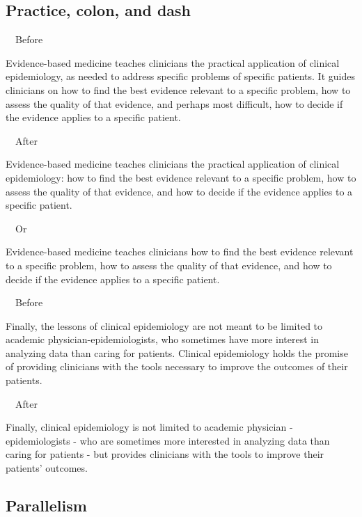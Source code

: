 \documentclass[a4paper, 12pt]{article}
\begin{document}
\subsection{Practice, colon, and dash}

\par\ \textbullet\ Before
\par Evidence-based medicine teaches clinicians the practical application of clinical epidemiology, as needed to address specific problems of specific patients. It guides clinicians on how to find the best evidence relevant to a specific problem, how to assess the quality of that evidence, and perhaps most difficult, how to decide if the evidence applies to a specific patient.

\par\ \textbullet\ After
\par Evidence-based medicine teaches clinicians the practical application of clinical epidemiology: how to find the best evidence relevant to a specific problem, how to assess the quality of that evidence, and how to decide if the evidence applies to a specific patient.

\par\ \textbullet\ Or
\par Evidence-based medicine teaches clinicians how to find the best evidence relevant to a specific problem, how to assess the quality of that evidence, and how to decide if the evidence applies to a specific patient.

\newpage\par\ \textbullet\ Before
\par Finally, the lessons of clinical epidemiology are not meant to be limited to academic physician-epidemiologists, who sometimes have more interest in analyzing data than caring for patients. Clinical epidemiology holds the promise of providing clinicians with the tools necessary to improve the outcomes of their patients.

\par\ \textbullet\ After
\par Finally, clinical epidemiology is not limited to academic physician - epidemiologists - who are sometimes more interested in analyzing data than caring for patients - but provides clinicians with the tools to improve their patients' outcomes.

\subsection{Parallelism}
\end{document}
